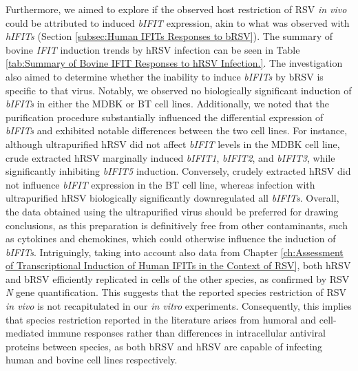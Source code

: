 Furthermore, we aimed to explore if the observed host restriction of RSV \textit{in vivo} could be attributed to induced \textit{bIFIT} expression, akin to what was observed with \textit{hIFITs} (Section \ref{subsec:Human IFITs Responses to bRSV}). The summary of bovine \textit{IFIT} induction trends by hRSV infection can be seen in Table \ref{tab:Summary of Bovine IFIT Responses to hRSV Infection.}. The investigation also aimed to determine whether the inability to induce \textit{bIFITs} by bRSV is specific to that virus. Notably, we observed no biologically significant induction of \textit{bIFITs} in either the MDBK or BT cell lines. Additionally, we noted that the purification procedure substantially influenced the differential expression of \textit{bIFITs} and exhibited notable differences between the two cell lines. For instance, although ultrapurified hRSV did not affect \textit{bIFIT} levels in the MDBK cell line, crude extracted hRSV marginally induced \textit{bIFIT1}, \textit{bIFIT2}, and \textit{bIFIT3}, while significantly inhibiting \textit{bIFIT5} induction. Conversely, crudely extracted hRSV did not influence \textit{bIFIT} expression in the BT cell line, whereas infection with ultrapurified hRSV biologically significantly downregulated all \textit{bIFITs}. Overall, the data obtained using the ultrapurified virus should be preferred for drawing conclusions, as this preparation is definitively free from other contaminants, such as cytokines and chemokines, which could otherwise influence the induction of \textit{bIFITs}. Intriguingly, taking into account also data from Chapter \ref{ch:Assessment of Transcriptional Induction of Human IFITs in the Context of RSV}, both hRSV and bRSV efficiently replicated in cells of the other species, as confirmed by RSV \textit{N} gene quantification. This suggests that the reported species restriction of RSV \textit{in vivo} is not recapitulated in our \textit{in vitro} experiments. Consequently, this implies that species restriction reported in the literature arises from humoral and cell-mediated immune responses rather than differences in intracellular antiviral proteins between species, as both bRSV and hRSV are capable of infecting human and bovine cell lines respectively.

